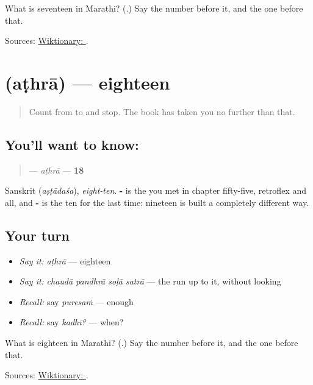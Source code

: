 \begin{tcolorbox}[breakable,colback=teal!4,colframe=teal!35!black,title={Before you move on}]
What is seventeen in Marathi? (\textbf{}.) Say the number before it, and the one before that.

Sources: \href{https://en.wiktionary.org/wiki/\%E0\%A4\%B8\%E0\%A4\%A4\%E0\%A4\%B0\%E0\%A4\%BE}{Wiktionary: }.
\end{tcolorbox}
\section[\texorpdfstring{\mr{अठरा} (aṭhrā)}{अठरा (aṭhrā)}]{ (aṭhrā) — eighteen}

\label{lesson:MR-C58-athra}



\begin{quote}
Count from \textbf{} to \textbf{} and stop. The book has taken you no further than that.
\end{quote}

\subsection*{You'll want to know: }
\begin{quote}
\textbf{} — \emph{aṭhrā} — \textbf{18}
\end{quote}

Sanskrit \textbf{} (\emph{aṣṭādaśa}), \emph{eight-ten}. \textbf{-} is the \textbf{} you met in chapter fifty-five, retroflex and all, and \textbf{-} is the ten for the last time: nineteen is built a completely different way.

\subsection*{Your turn}
\begin{itemize}
\raggedright
  \item \emph{Say it:} \emph{aṭhrā} — eighteen
  \item \emph{Say it:} \emph{chaudā pandhrā soḷā satrā} — the run up to it, without looking
  \item \emph{Recall:} say \emph{puresaṁ} — enough
  \item \emph{Recall:} say \emph{kadhī?} — when?
\end{itemize}

\begin{tcolorbox}[breakable,colback=teal!4,colframe=teal!35!black,title={Before you move on}]
What is eighteen in Marathi? (\textbf{}.) Say the number before it, and the one before that.

Sources: \href{https://en.wiktionary.org/wiki/\%E0\%A4\%85\%E0\%A4\%A0\%E0\%A4\%B0\%E0\%A4\%BE}{Wiktionary: }.
\end{tcolorbox}
